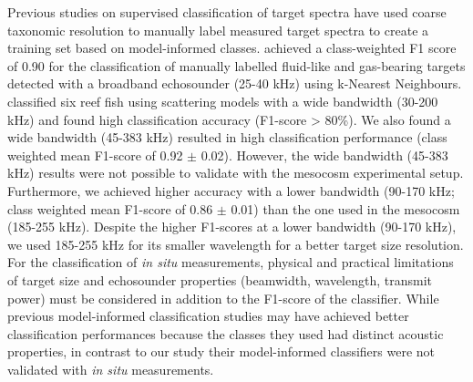 Previous studies on supervised classification of target spectra have used coarse taxonomic resolution to manually label measured target spectra to create a training set based on model-informed classes. \citep{Cotter2021} achieved a class-weighted F1 score of 0.90 for the classification of manually labelled fluid-like and gas-bearing targets detected with a broadband echosounder (25-40 kHz) using k-Nearest Neighbours. \citep{Roa2022} classified six reef fish using scattering models with a wide bandwidth (30-200 kHz) and found high classification accuracy (F1-score > 80\%). We also found a wide bandwidth (45-383 kHz) resulted in high classification performance (class weighted mean F1-score of 0.92 $\pm$ 0.02). However, the wide bandwidth (45-383 kHz) results were not possible to validate with the mesocosm experimental setup. Furthermore, we achieved higher accuracy with a lower bandwidth (90-170 kHz; class weighted mean F1-score of 0.86 $\pm$ 0.01) than the one used in the mesocosm (185-255 kHz). Despite the higher F1-scores at a lower bandwidth (90-170 kHz), we used 185-255 kHz for its smaller wavelength for a better target size resolution. For the classification of \textit{in situ} measurements, physical and practical limitations of target size and echosounder properties (beamwidth, wavelength, transmit power) must be considered in addition to the F1-score of the classifier. While previous model-informed classification studies \citep{Cotter2021, Roa2022} may have achieved better classification performances because the classes they used had distinct acoustic properties, in contrast to our study their model-informed classifiers were not validated with \textit{in situ} measurements.

